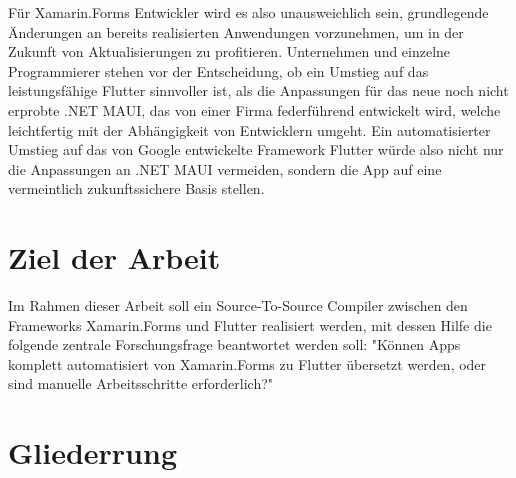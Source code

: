 Für Xamarin.Forms Entwickler wird es also unausweichlich sein, grundlegende Änderungen an bereits realisierten Anwendungen vorzunehmen,  um in der Zukunft von Aktualisierungen zu profitieren.  Unternehmen und einzelne Programmierer stehen vor der Entscheidung,  ob ein Umstieg auf das leistungsfähige Flutter sinnvoller ist,  als die Anpassungen für das neue noch nicht erprobte .NET MAUI, das von einer Firma federführend entwickelt wird,  welche leichtfertig mit der Abhängigkeit von Entwicklern umgeht.
Ein automatisierter Umstieg auf das von Google entwickelte Framework Flutter würde also nicht nur die Anpassungen an .NET MAUI vermeiden, sondern die App auf eine vermeintlich zukunftssichere Basis stellen.  

\section{Ziel der Arbeit}
Im Rahmen dieser Arbeit soll ein Source-To-Source Compiler zwischen den Frameworks Xamarin.Forms und Flutter realisiert werden, mit dessen Hilfe die folgende zentrale Forschungsfrage beantwortet werden soll: "Können Apps komplett automatisiert von Xamarin.Forms zu Flutter übersetzt werden, oder sind manuelle Arbeitsschritte erforderlich?"


\section{Gliederrung}
